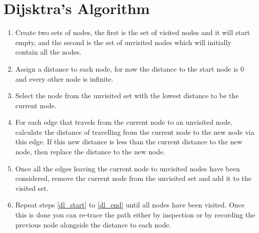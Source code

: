 \documentclass[a4paper,12pt]{article}
\begin{document}
\large
\section*{Dijsktra's Algorithm}

\begin{enumerate}
\item Create two sets of nodes, the first is the set of visited nodes 
and it will start empty, and the second is the set of unvisited nodes 
which will initially contain all the nodes.
\item Assign a distance to each node, for now the distance to the 
start node is 0 and every other node is infinite.
\item Select the node from the unvisited set with the lowest distance 
to be the current node. \label{dl_start}
\item For each edge that travels from the current node to an unvisited 
node, calculate the distance of travelling from the current node 
to the new node via this edge. If this new distance is less than 
the current distance to the new node, then replace the distance to 
the new node. 
\item Once all the edges leaving the current node to unvisited nodes 
have been considered, remove the current node from the unvisited set 
and add it to the visited set. \label{dl_end}
\item Repeat steps \ref{dl_start} to \ref{dl_end} until all nodes have 
been visited. Once this is done you can re-trace the path either by 
inspection or by recording the previous node alongside the distance to 
each node.
\end{enumerate}

\end{document}
